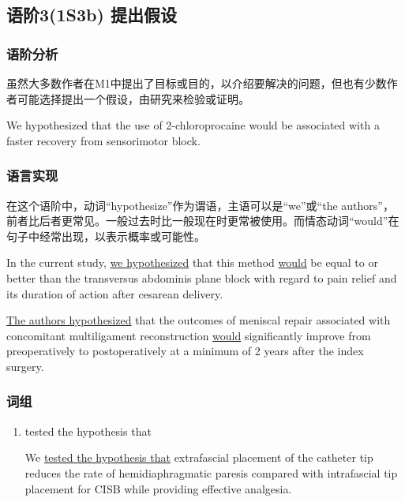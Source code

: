 \documentclass[a4paper]{ctexbook}
\begin{document}
  \subsection{语阶3(1S3b) 提出假设}
    
    \subsubsection{语阶分析}

    虽然大多数作者在M1中提出了目标或目的，以介绍要解决的问题，但也有少数作者可能选择提出一个假设，由研究来检验或证明。

    \begin{eg}{}
      We hypothesized that the use of 2-chloroprocaine would be associated with a faster recovery from sensorimotor block.
    \end{eg}

    \subsubsection{语言实现}

    在这个语阶中，动词“hypothesize”作为谓语，主语可以是“we”或“the authors”，前者比后者更常见。一般过去时比一般现在时更常被使用。而情态动词“would”在句子中经常出现，以表示概率或可能性。

    \begin{eg}{}
      In the current study, \uline{we hypothesized} that this method \uline{would} be equal to or better than the transversus abdominis plane block with regard to pain relief and its duration of action after cesarean delivery.
    \end{eg}

    \begin{eg}{}
      \uline{The authors hypothesized} that the outcomes of meniscal repair associated with concomitant multiligament reconstruction \uline{would} significantly improve from preoperatively to postoperatively at a minimum of 2 years after the index surgery.
    \end{eg}


    \subsubsection{词组}

    \begin{enumerate}
      \item tested the hypothesis that
      \begin{eg}
        We \uline{tested the hypothesis that} extrafascial placement of the catheter tip reduces the rate of hemidiaphragmatic paresis compared with intrafascial tip placement for CISB while providing effective analgesia.
      \end{eg}
    \end{enumerate}
\end{document}
